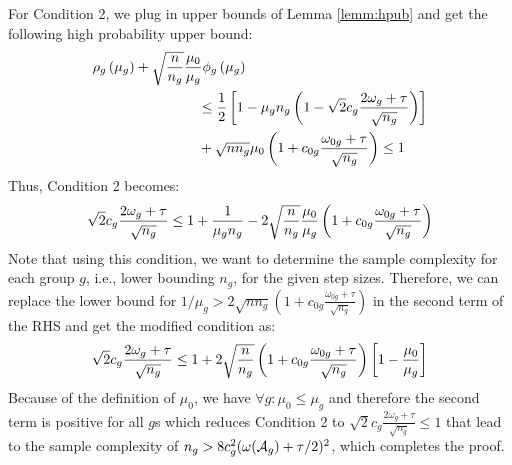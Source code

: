 	For Condition 2, we plug in upper bounds of Lemma \ref{lemm:hpub} and get the following high probability upper bound: 
	\begin{align}	
	\nonumber 
	&\rho_g\left(\mu_g\right) +  \sqrt{\frac{n}{n_g}} \frac{\mu_0}{\mu_g}\phi_g\left( \mu_g \right)
	\\ \nonumber
	&\hspace*{75pt}\leq	 \frac{1}{2} \left[1 - \mu_g n_g \left(1 - \sqrt{2} c_g\frac{2 \omega_g + \tau}{ \sqrt{n_g}} \right)\right]  
	\\ \nonumber 
	&\hspace*{75pt}+  \sqrt{nn_g}\mu_0 \left(1 + c_{0g}\frac{\omega_{0g} + \tau}{\sqrt{n_g}} \right)
	\leq 1
	\end{align} 
	Thus, Condition 2 becomes: 		
	\begin{align}	
	\nonumber 
	\sqrt{2} c_g\frac{2 \omega_g + \tau}{ \sqrt{n_g}}
	\leq 1 + \frac{1}{\mu_g n_g} -  2\sqrt{\frac{n}{n_g}}\frac{\mu_0}{\mu_g} \left(1 + c_{0g}\frac{\omega_{0g} + \tau}{\sqrt{n_g}} \right)
	\end{align} 
	Note that using this condition, we want to determine the sample complexity for each group $g$, i.e., lower bounding $n_g$, for the given step sizes. Therefore, we can replace the lower bound for $1/\mu_g > 2\sqrt{n n_g} \left(1 + c_{0g}\frac{\omega_{0g} + \tau}{\sqrt{n_g}} \right)$ in the second term of the RHS and get the modified condition as:
	\begin{align}	
	\nonumber 
	\sqrt{2} c_g\frac{2 \omega_g + \tau}{ \sqrt{n_g}}
	\leq 1 + 2\sqrt{\frac{n}{n_g}} \left(1 + c_{0g}\frac{\omega_{0g} + \tau}{\sqrt{n_g}} \right) \left[1 - \frac{\mu_0}{\mu_g}\right]
	\end{align} 
	Because of the definition of $\mu_0$, we have $\forall g: \mu_0 \leq \mu_g$ and therefore the second term is positive for all $g$s which reduces Condition 2 to $\sqrt{2} c_g\frac{2 \omega_g + \tau}{ \sqrt{n_g}} \leq 1$ that lead to the sample complexity of $n_g > 8c^2_g (\omega(\cA_g) + \tau/2)^2$, which completes the proof.
	\hfill {\qedsymbol}